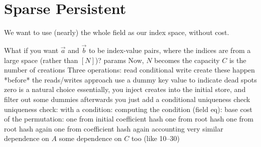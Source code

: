 \section{Sparse Persistent}
We want to use (nearly) the whole field
as our index space, without cost.
\begin{outline}
  \1 What if you want $\vec a$ and $\vec b$ to be index-value pairs, where the
  indices are from a large space (rather than $[N]$)?
\1 params
  \2 Now, $N$ becomes the capacity
  \2 $C$ is the number of creations
\1 Three operations:
  \2 read
  \2 conditional write
  \2 create
    \3 these happen *before* the reads/writes
\1 approach
  \2 use a dummy key value to indicate dead spots
     \3 zero is a natural choice
  \2 essentially, you inject creates into the initial store,
     and filter out some dummies afterwards
  \2 you just add a conditional uniqueness check
    \3 uniqueness check: 
    \3 with a condition: 
    \3 computing the condition (field eq): 
  \2 base cost of the permutation: 
    \3 one from initial coefficient hash
    \3 one from root hash
    \3 one from root hash again
    \3 one from coefficient hash again
\1 accounting
  \2 
  \2 very similar dependence on $A$
  \2 some dependence on $C$ too (like 10--30)
\end{outline}
